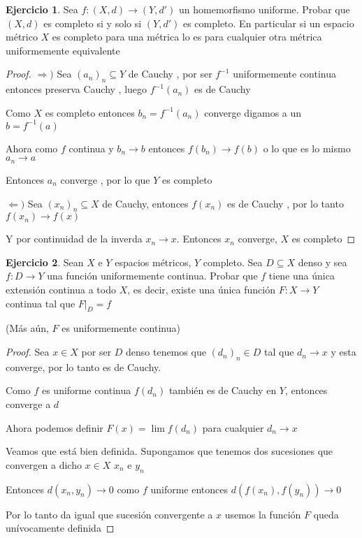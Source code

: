 \documentclass[12pt]{article}
\newcommand{\Ra}{\Rightarrow}
\newcommand{\ra}{\rightarrow}
\theoremstyle{definition}
\newtheorem{ej}{Ejercicio}
\begin{document}
\begin{ej}
  Sea $f: (X,d) \ra (Y,d')$ un homemorfismo uniforme. Probar que $(X,d)$ es completo si y solo si $(Y,d')$ es completo.
  En particular si un espacio métrico $X$ es completo para una métrica lo es para cualquier otra métrica uniformemente equivalente
  \begin{proof}
  $\Ra )$
    Sea $(a_n)_n \subseteq Y$ de Cauchy , por ser $f^{-1}$ uniformemente continua entonces preserva Cauchy , luego $f^{-1}(a_n)$ es de Cauchy

  Como $X$ es completo entonces $b_n = f^{-1}(a_n)$ converge digamos a un $b = f^{-1}(a)$

  Ahora como $f$ continua y $b_n \ra b$ entonces $f(b_n) \ra f(b)$ o lo que es lo mismo $a_n \ra a$

  Entonces $a_n$ converge , por lo que $Y$ es completo

$\Leftarrow )$ Sea $(x_n)_n \subseteq X$ de Cauchy, entonces $f(x_n)$ es de Cauchy , por lo tanto $f(x_n) \ra f(x)$

Y por continuidad de la inverda $x_n \ra x$. Entonces $x_n$ converge, $X$ es completo
  \end{proof}
\end{ej}
\newpage
\begin{ej}
  Sean $X$ e $Y$ espacios métricos, $Y$ completo. Sea $D \subseteq X$ denso y sea $f: D \ra Y$ una función uniformemente continua. Probar que $f$ tiene una única extensión continua a todo $X$, es decir, existe una única función $F: X \ra Y$ continua tal que $F|_D = f $ 

  (Más aún, $F$ es uniformemente continua)	  
  \begin{proof}
    Sea $x \in X$ por ser $D$ denso tenemos que $(d_n)_n \in D$ tal que $d_n \ra x$ y esta converge, por lo tanto es de Cauchy.

    Como $f$ es uniforme continua $f(d_n)$ también es de Cauchy en $Y$, entonces converge a $d$

    Ahora podemos definir $F(x) = \lim f(d_n)$ para cualquier $d_n \ra x$

    Veamos que está bien definida. Supongamos que tenemos dos sucesiones que convergen a dicho $x \in X$ $x_n$ e $y_n$

    Entonces $d(x_n,y_n) \ra 0$ como $f$ uniforme entonces $d(f(x_n),f(y_n)) \ra 0$

	  Por lo tanto da igual que sucesión convergente a $x$ usemos la función $F$ queda unívocamente definida
  \end{proof}
\end{ej}
\end{document}
